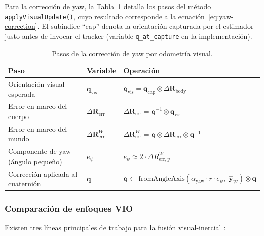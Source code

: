 Para la corrección de yaw, la Tabla~\ref{tab:vio-yaw-correction} detalla los
pasos del método \texttt{applyVisualUpdate()}, cuyo resultado corresponde a
la ecuación~\ref{eq:yaw-correction}. El subíndice ``cap'' denota la
orientación capturada por el estimador justo antes de invocar el tracker
(variable \texttt{q\_at\_capture} en la implementación).

\begin{table}[h]
\centering
\caption{Pasos de la corrección de yaw por odometría visual.}
\label{tab:vio-yaw-correction}
\begin{tabularx}{\textwidth}{llX}
\hline
\textbf{Paso} & \textbf{Variable} & \textbf{Operación} \\
\hline
Orientación visual esperada
  & $\mathbf{q}_{\text{vis}}$
  & $\mathbf{q}_{\text{vis}} = \mathbf{q}_{\text{cap}} \otimes
    \Delta\mathbf{R}_{\text{body}}$ \\[2pt]
Error en marco del cuerpo
  & $\Delta\mathbf{R}_{\text{err}}$
  & $\Delta\mathbf{R}_{\text{err}} = \mathbf{q}^{-1} \otimes
    \mathbf{q}_{\text{vis}}$ \\[2pt]
Error en marco del mundo
  & $\Delta\mathbf{R}_{\text{err}}^W$
  & $\Delta\mathbf{R}_{\text{err}}^W = \mathbf{q} \otimes
    \Delta\mathbf{R}_{\text{err}} \otimes \mathbf{q}^{-1}$ \\[2pt]
Componente de yaw (ángulo pequeño)
  & $e_\psi$
  & $e_\psi \approx 2 \cdot \Delta R^W_{\text{err},y}$ \\[2pt]
Corrección aplicada al cuaternión
  & $\mathbf{q}$
  & $\mathbf{q} \leftarrow
    \text{fromAngleAxis}(\alpha_{\text{yaw}} \cdot r \cdot e_\psi,\;
    \hat{\mathbf{y}}_W) \otimes \mathbf{q}$ \\[2pt]
\hline
\end{tabularx}
\end{table}

\subsubsection{Comparación de enfoques VIO}

Existen tres líneas principales de trabajo para la fusión visual-inercial
\cite{Forster2017}:

